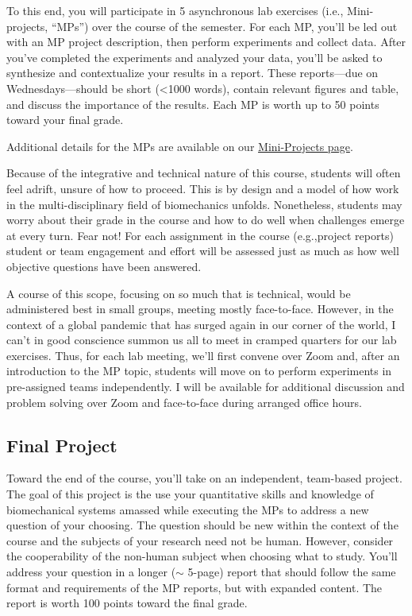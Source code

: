 \documentclass[
]{article}
\begin{document}
To this end, you will participate in 5 asynchronous lab exercises (i.e.,
Mini-projects, ``MPs'') over the course of the semester. For each MP,
you'll be led out with an MP project description, then perform
experiments and collect data. After you've completed the experiments and
analyzed your data, you'll be asked to synthesize and contextualize your
results in a report. These reports---due on Wednesdays---should be short
(\textless 1000 words), contain relevant figures and table, and discuss
the importance of the results. Each MP is worth up to 50 points toward
your final grade.

Additional details for the MPs are available on our
\href{mini_projects.html}{Mini-Projects page}.

Because of the integrative and technical nature of this course, students
will often feel adrift, unsure of how to proceed. This is by design and
a model of how work in the multi-disciplinary field of biomechanics
unfolds. Nonetheless, students may worry about their grade in the course
and how to do well when challenges emerge at every turn. Fear not! For
each assignment in the course (e.g.,project reports) student or team
engagement and effort will be assessed just as much as how well
objective questions have been answered.

A course of this scope, focusing on so much that is technical, would be
administered best in small groups, meeting mostly face-to-face. However,
in the context of a global pandemic that has surged again in our corner
of the world, I can't in good conscience summon us all to meet in
cramped quarters for our lab exercises. Thus, for each lab meeting,
we'll first convene over Zoom and, after an introduction to the MP
topic, students will move on to perform experiments in pre-assigned
teams independently. I will be available for additional discussion and
problem solving over Zoom and face-to-face during arranged office hours.

\hypertarget{final-project}{%
\subsection{Final Project}\label{final-project}}

Toward the end of the course, you'll take on an independent, team-based
project. The goal of this project is the use your quantitative skills
and knowledge of biomechanical systems amassed while executing the MPs
to address a new question of your choosing. The question should be new
within the context of the course and the subjects of your research need
not be human. However, consider the cooperability of the non-human
subject when choosing what to study. You'll address your question in a
longer ($\sim$ 5-page) report that should follow the same format and
requirements of the MP reports, but with expanded content. The report is
worth 100 points toward the final grade.
\end{document}
